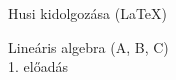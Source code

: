 \documentclass[a4paper,11.5pt]{article}
\begin{document}


	\def\a{\textbf{a}}

	\def\b{\textbf{b}}

	\def\N{\hskip 10 true mm}

	\def\a{\textbf{a}}

	\def\b{\textbf{b}}

	\def\c{\textbf{c}}

	\def\d{\textbf{d}}

	\def\e{\textbf{e}}

	\def\gg{$\gamma$}

	\def\vi{\textbf{i}}

	\def\jj{\textbf{j}}

	\def\kk{\textbf{k}}

	\def\fh{\overrightarrow}

	\def\l{\lambda}

	\def\m{\mu}

	\def\v{\textbf{v}}

	\def\0{\textbf{0}}

	\def\s{\hspace{0.2mm}\vphantom{\beta}}

	\def\Z{\mathbb{Z}}
	\def\Q{\mathbb{Q}}
	\def\R{\mathbb{R}}
	\def\C{\mathbb{C}}
	\def\N{\mathbb{N}}
	\def\Rn{\mathbb{R}^{n}}



	\begin{flushright}

		Husi kidolgozása (\LaTeX)

	\end{flushright}

	\begin{center}

		Lineáris algebra (A, B, C)\\

	1. előadás

	\end{center}
\end{document}
